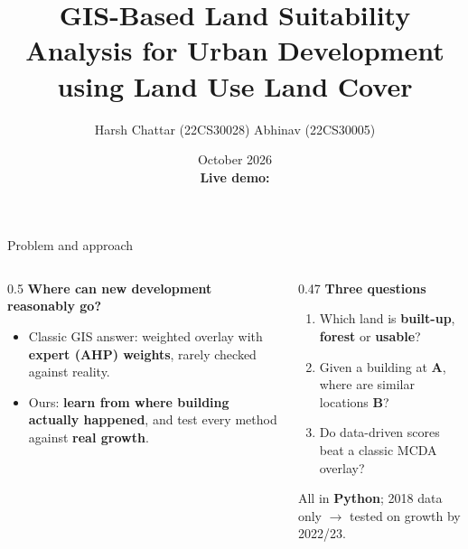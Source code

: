 \documentclass[aspectratio=169,11pt]{beamer}
\title{GIS-Based Land Suitability Analysis for Urban Development\\using Land Use Land Cover}
\author{Harsh Chattar (22CS30028) \quad Abhinav (22CS30005)}
\institute{CS60111 Geographical Information Systems}
\date{October 2026\\[0.6em]\textbf{Live demo:} \livelink}
\newcommand{\hl}[1]{\alert{\textbf{#1}}}
\begin{document}
\maketitle

\begin{frame}{Problem and approach}
  \small
  \begin{columns}[T]
    \begin{column}{0.5\textwidth}
      \textbf{Where can new development reasonably go?}
      \begin{itemize}
        \item Classic GIS answer: weighted overlay with \hl{expert (AHP) weights},
              rarely checked against reality.
        \item Ours: \hl{learn from where building actually happened}, and test every
              method against \hl{real growth}.
      \end{itemize}
    \end{column}
    \begin{column}{0.47\textwidth}
      \textbf{Three questions}
      \begin{enumerate}
        \item Which land is \textcolor{built}{\textbf{built-up}},
              \textcolor{forest}{\textbf{forest}} or \textcolor{usable}{\textbf{usable}}?
        \item Given a building at \textbf{A}, where are similar locations \textbf{B}?
        \item Do data-driven scores beat a classic MCDA overlay?
      \end{enumerate}
      \vspace{0.3em}
      All in \textbf{Python}; 2018 data only $\rightarrow$ tested on growth by 2022/23.
    \end{column}
  \end{columns}
\end{frame}
\end{document}
